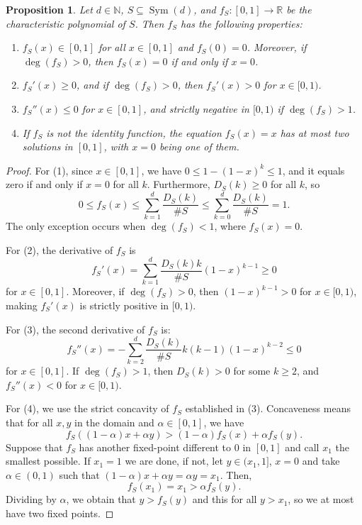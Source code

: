 \documentclass{amsart}
\def\NN{\mathbb N}
\def\RR{\mathbb R}
\DeclareMathOperator{\Sym}{Sym}
\newtheorem{Proposition}{Proposition}[section]
\begin{document}
\begin{Proposition}
Let $d \in \NN$, $S \subseteq \Sym(d)$, and $f_S: [0,1] \rightarrow \RR$ be the characteristic polynomial of $S$. Then $f_S$ has the following properties:
\begin{enumerate}
\item $f_S(x) \in [0,1]$ for all $x \in [0,1]$ and $f_S(0) = 0$. Moreover, if $\deg(f_S) > 0$, then $f_S(x) = 0$ if and only if $x = 0$.
\item $f_S'(x) \geq 0$, and if $\deg(f_S) > 0$, then $f_S'(x) > 0$ for $x \in [0,1)$.
\item $f_S''(x) \leq 0$ for $x \in [0,1]$, and strictly negative in $[0,1)$ if $\deg(f_S) > 1$.
\item If $f_S$ is not the identity function, the equation $f_S(x) = x$ has at most two solutions in $[0,1]$, with $x = 0$ being one of them.
\end{enumerate}
\label{proposition: properties fS}
\end{Proposition}

\begin{proof}
For (1), since $x \in [0,1]$, we have $0 \leq 1 - (1-x)^k \leq 1$, and it equals zero if and only if $ x= 0$ for all $k$. Furthermore, $D_S(k) \geq 0$ for all $k$, so $$0 \leq f_S(x) \leq \sum_{k = 1}^d \frac{D_S(k)}{\# S} \leq \sum_{k = 0}^d \frac{D_S(k)}{\# S} = 1.$$ The only exception occurs when $\deg(f_S) < 1$, where $f_S(x) = 0$.

\bigskip

For (2), the derivative of $f_S$ is $$f_S'(x) = \sum_{k = 1}^d \frac{D_S(k) k}{\# S} (1-x)^{k-1} \geq 0$$ for $x \in [0,1]$. Moreover, if $\deg(f_S) > 0$, then $(1-x)^{k-1} > 0$ for $x \in [0,1)$, making $f_S'(x)$ is strictly positive in $[0,1)$. 

\bigskip

For (3), the second derivative of $f_S$ is: $$f_S''(x) = - \sum_{k = 2}^d \frac{D_S(k)}{\# S} k(k-1) (1-x)^{k-2} \leq 0$$ for $x \in [0,1]$. If $\deg(f_S) > 1$, then $D_S(k) > 0$ for some $k \geq 2$, and $f_S''(x) < 0$ for $x \in [0,1)$.

\bigskip 

For (4), we use the strict concavity of $f_S$ established in (3). Concaveness means that for all $x,y$ in the domain and $\alpha \in [0,1]$, we have $$f_S((1-\alpha)x + \alpha y ) > (1-\alpha) f_S(x) + \alpha f_S(y).$$ Suppose that $f_S$ has another fixed-point different to $0$ in $[0,1]$ and call $x_1$ the smallest possible. If $x_1 = 1$ we are done, if not, let $y \in (x_1,1]$, $x = 0$ and take $\alpha \in (0,1)$ such that $(1-\alpha)x + \alpha y = \alpha y = x_1$. Then, $$f_S(x_1) = x_1 > \alpha f_S(y).$$ Dividing by $\alpha$, we obtain that $y > f_S(y)$ and this for all $y > x_1$, so we at most have two fixed points.
\end{proof}
\end{document}
